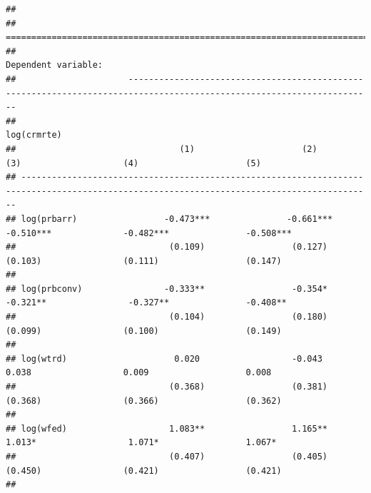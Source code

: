 \documentclass[]{article}
\begin{document}
\begin{verbatim}
## 
## ===========================================================================================================================================
##                                                                       Dependent variable:                                                  
##                      ----------------------------------------------------------------------------------------------------------------------
##                                                                           log(crmrte)                                                      
##                                (1)                     (2)                     (3)                    (4)                     (5)          
## -------------------------------------------------------------------------------------------------------------------------------------------
## log(prbarr)                 -0.473***               -0.661***               -0.510***              -0.482***               -0.508***       
##                              (0.109)                 (0.127)                 (0.103)                (0.111)                 (0.147)        
##                                                                                                                                            
## log(prbconv)                -0.333**                 -0.354*                -0.321**                -0.327**               -0.408**        
##                              (0.104)                 (0.180)                 (0.099)                (0.100)                 (0.149)        
##                                                                                                                                            
## log(wtrd)                     0.020                  -0.043                   0.038                  0.009                   0.008         
##                              (0.368)                 (0.381)                 (0.368)                (0.366)                 (0.362)        
##                                                                                                                                            
## log(wfed)                    1.083**                 1.165**                 1.013*                  1.071*                 1.067*         
##                              (0.407)                 (0.405)                 (0.450)                (0.421)                 (0.421)        
##                                                                                                                                            

\end{verbatim}
\end{document}
